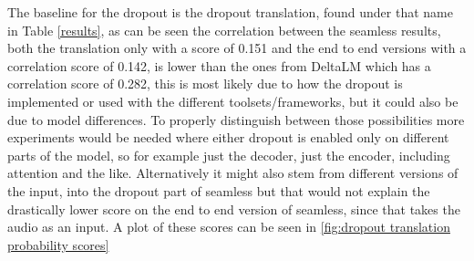 The baseline for the dropout is the dropout translation, found under that name in Table \autoref{results}, as can be seen the correlation between the seamless results, both the translation only with a score of 0.151 and the end to end versions with a correlation score of 0.142, is lower than the ones from DeltaLM which has a correlation score of 0.282, this is most likely due to how the dropout is implemented or used with the different toolsets/frameworks, but it could also be due to model differences. To properly distinguish between those possibilities more experiments would be needed where either dropout is enabled only on different parts of the model, so for example just the decoder, just the encoder, including attention and the like. Alternatively it might also stem from different versions of the input, into the dropout part of seamless but that would not explain the drastically lower score on the end to end version of seamless, since that takes the audio as an input. 
A plot of these scores can be seen in \autoref{fig:dropout translation probability scores}
